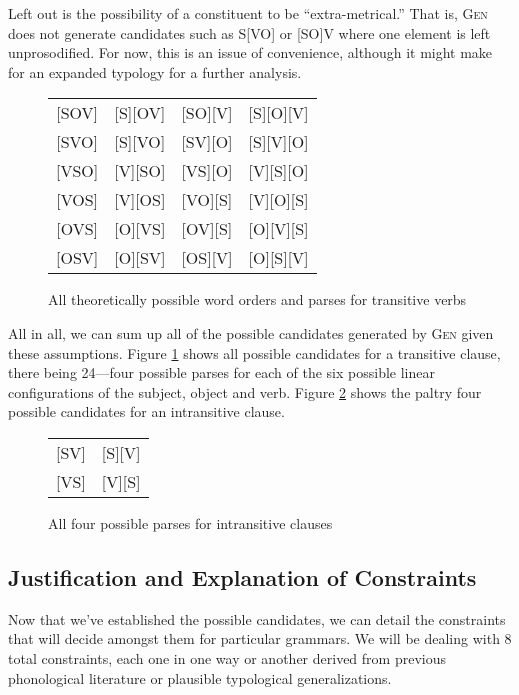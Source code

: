 \documentclass{article}
\begin{document}
Left out is the possibility of a constituent to be ``extra-metrical.''
That is, \textsc{Gen} does not generate candidates such as S[VO] or [SO]V where one element is left unprosodified.
For now, this is an issue of convenience, although it might make for an expanded typology for a further analysis.


\begin{figure}
	\begin{center}
	\begin{tabular}{cccc}
		{}[SOV]&[S][OV]&[SO][V]&[S][O][V]\\
		{}[SVO]&[S][VO]&[SV][O]&[S][V][O]\\
		{}[VSO]&[V][SO]&[VS][O]&[V][S][O]\\
		{}[VOS]&[V][OS]&[VO][S]&[V][O][S]\\
		{}[OVS]&[O][VS]&[OV][S]&[O][V][S]\\
		{}[OSV]&[O][SV]&[OS][V]&[O][S][V]\\
	\end{tabular}
	\end{center}
	\caption{All theoretically possible word orders and parses for transitive verbs\label{allcand}}
\end{figure}

All in all, we can sum up all of the possible candidates generated by \textsc{Gen} given these assumptions.
Figure \ref{allcand} shows all possible candidates for a transitive clause, there being 24---four possible parses for each of the six possible linear configurations of the subject, object and verb.
Figure \ref{instrans} shows the paltry four possible candidates for an intransitive clause.

\begin{figure}
	\begin{center}
		\begin{tabular}{cc}
			{}[SV]&[S][V]\\
			{}[VS]&[V][S]\\
		\end{tabular}
	\end{center}
	\caption{All four possible parses for intransitive clauses\label{instrans}}
\end{figure}

\subsection{Justification and Explanation of Constraints\label{straints}}

Now that we've established the possible candidates, we can detail the constraints that will decide amongst them for particular grammars.
We will be dealing with 8 total constraints, each one in one way or another derived from previous phonological literature or plausible typological generalizations.
\end{document}
